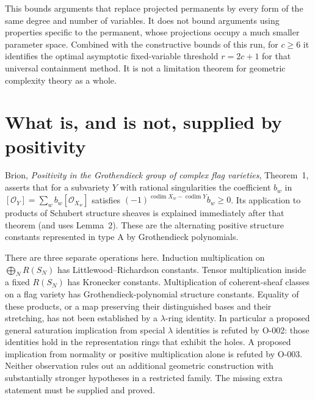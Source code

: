 This bounds arguments that replace projected permanents by every
form of the same degree and number of variables. It does not bound
arguments using properties specific to the permanent, whose
projections occupy a much smaller parameter space. Combined with
the constructive bounds of this run, for $c\geq6$ it identifies
the optimal asymptotic fixed-variable threshold $r=2c+1$ for that
universal containment method. It is not a limitation theorem for
geometric complexity theory as a whole.




















\section{What is, and is not, supplied by positivity}

Brion, \emph{Positivity in the Grothendieck group of complex flag
varieties}, Theorem~1, asserts that for a subvariety $Y$ with rational
singularities the coefficient $b_w$ in
$[\mathcal O_Y]=\sum_w b_w[\mathcal O_{X_w}]$ satisfies
$(-1)^{\operatorname{codim}X_w-\operatorname{codim}Y}b_w\geq0$.
Its application to products of Schubert structure sheaves is explained
immediately after that theorem (and uses Lemma~2). These are the
alternating positive structure constants represented in type A by
Grothendieck polynomials.

There are three separate operations here. Induction multiplication on
$\bigoplus_N R(S_N)$ has Littlewood--Richardson constants. Tensor
multiplication inside a fixed $R(S_N)$ has Kronecker constants.
Multiplication of coherent-sheaf classes on a flag variety has
Grothendieck-polynomial structure constants. Equality of these
products, or a map preserving their distinguished bases and their
stretching, has not been established by a $\lambda$-ring identity.
In particular a proposed general saturation implication from special
$\lambda$ identities is refuted by O-002: those identities hold in
the representation rings that exhibit the holes.  A proposed
implication from normality or positive multiplication alone is refuted
by O-003. Neither observation rules out an additional geometric
construction with substantially stronger hypotheses in a restricted
family. The missing extra statement must be supplied and proved.

